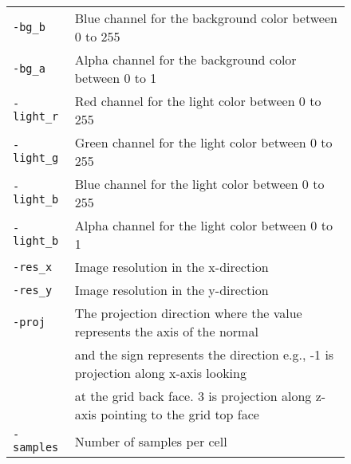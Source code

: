 \documentclass[12pt]{article}
\begin{document}
\begin{figure}[tbh]
\begin{tabular}{ |l| l|}
  \texttt{-bg\_b}  &      Blue channel for the background color between 0 to 255 \\    
  \texttt{-bg\_a}  &      Alpha channel for the background color between 0 to 1 \\      
  \texttt{-light\_r}  &     Red channel for the light color between 0 to 255 \\      
  \texttt{-light\_g}  &     Green channel for the light color between 0 to 255 \\      
  \texttt{-light\_b}  &     Blue channel for the light color between 0 to 255 \\      
  \texttt{-light\_b}  &     Alpha channel for the light color between 0 to 1 \\      
  \texttt{-res\_x}  &       Image resolution in the x-direction \\      
  \texttt{-res\_y}  &       Image resolution in the y-direction \\      
  \texttt{-proj}  &       The projection direction where the value represents the axis of the normal\\  
			         &   and the sign represents the direction e.g., -1 is projection along x-axis looking\\
			         &   at the grid back face. 3 is projection along z-axis pointing to the grid top face\\      
  \texttt{-samples}  &   Number of samples per cell \\      
    
  \hline
\end{tabular} 

   \label{tab:metric}
\end{figure} 
	        
\newpage






\end{document}
